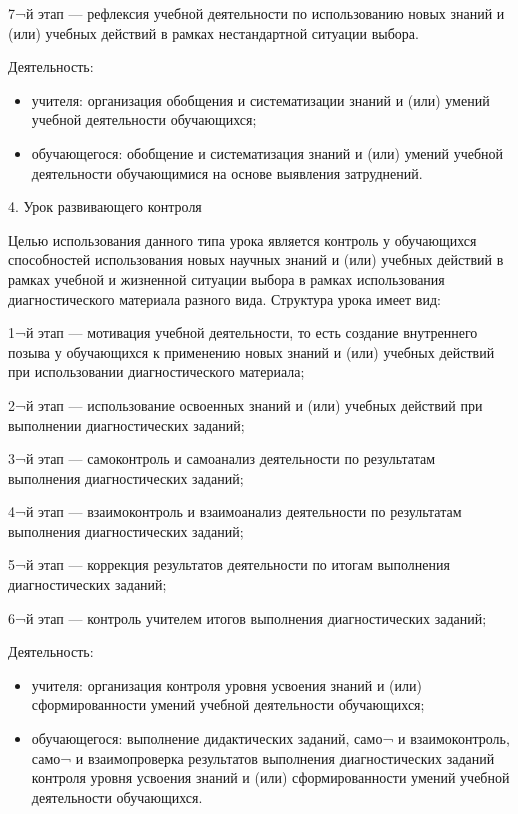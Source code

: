 \documentclass[
  11pt,
  russian,
]{book}
\begin{document}
7¬й этап --- рефлексия учебной деятельности по использованию новых
знаний и (или) учебных действий в рамках нестандартной ситуации выбора.

Деятельность:

\begin{itemize}
\item
  учителя: организация обобщения и систематизации знаний и (или) умений
  учебной деятельности обучающихся;
\item
  обучающегося: обобщение и систематизация знаний и (или) умений учебной
  деятельности обучающимися на основе выявления затруднений.
\end{itemize}

4. Урок развивающего контроля

Целью использования данного типа урока является контроль у обучающихся
способностей использования новых научных знаний и (или) учебных действий
в рамках учебной и жизненной ситуации выбора в рамках использования
диагностического материала разного вида. Структура урока имеет вид:

1¬й этап --- мотивация учебной деятельности, то есть создание
внутреннего позыва у обучающихся к применению новых знаний и (или)
учебных действий при использовании диагностического материала;

2¬й этап --- использование освоенных знаний и (или) учебных действий при
выполнении диагностических заданий;

3¬й этап --- самоконтроль и самоанализ деятельности по результатам
выполнения диагностических заданий;

4¬й этап --- взаимоконтроль и взаимоанализ деятельности по результатам
выполнения диагностических заданий;

5¬й этап --- коррекция результатов деятельности по итогам выполнения
диагностических заданий;

6¬й этап --- контроль учителем итогов выполнения диагностических
заданий;

Деятельность:

\begin{itemize}
\item
  учителя: организация контроля уровня усвоения знаний и (или)
  сформированности умений учебной деятельности обучающихся;
\item
  обучающегося: выполнение дидактических заданий, само¬ и
  взаимоконтроль, само¬ и взаимопроверка результатов выполнения
  диагностических заданий контроля уровня усвоения знаний и (или)
  сформированности умений учебной деятельности обучающихся.
\end{itemize}
\end{document}
